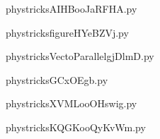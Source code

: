     \newcommand{\CaptionFigAIHBooJaRFHA}{<+Type your caption here+>}
    \begin{center}
        
    \end{center}
    phystricksAIHBooJaRFHA.py

    

    \clearpage
    


    \newcommand{\CaptionFigfigureHYeBZVj}{<+Type your caption here+>}
    \begin{center}
        
    \end{center}
    phystricksfigureHYeBZVj.py

    

    \clearpage
    


    \newcommand{\CaptionFigVectoParallelgjDlmD}{<+Type your caption here+>}
    \begin{center}
        
    \end{center}
    phystricksVectoParallelgjDlmD.py

    

    \clearpage
    


    \newcommand{\CaptionFigGCxOEgb}{<+Type your caption here+>}
    \begin{center}
        
    \end{center}
    phystricksGCxOEgb.py

    

    \clearpage
    


    \newcommand{\CaptionFigXVMLooOHswig}{<+Type your caption here+>}
    \begin{center}
        
    \end{center}
    phystricksXVMLooOHswig.py

    

    \clearpage
    


    \newcommand{\CaptionFigKQGKooQyKvWm}{<+Type your caption here+>}
    \begin{center}
        
    \end{center}
    phystricksKQGKooQyKvWm.py

